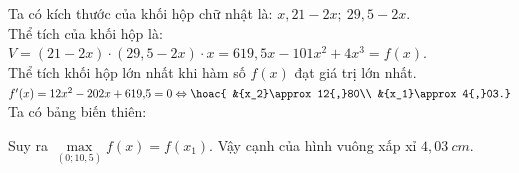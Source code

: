 \begin{bt}
{		Ta có kích thước của khối hộp chữ nhật là: $ x, 21-2x;\ 29, 5-2x$.\\
		Thể tích của khối hộp là: $V=\left(21-2x\right)\cdot \left(29{,}5-2x\right)\cdot x=619{,}5x-101x^2+4x^3=f(x)$.\\
		Thể tích khối hộp lớn nhất khi hàm số $ f(x)$ đạt giá trị lớn nhất.\\
		$ f^\prime(x)=12x^2-202x+619{,}5=0\Leftrightarrow \hoac{
			&{x_2}\approx 12{,}80\\ 
			&{x_1}\approx 4{,}03.}$\\
		Ta có bảng biến thiên:
		\begin{center}
		\end{center}
		Suy ra
		$\max \limits_{(0 ; 10{,}5)} f(x)=f\left(x_1\right)$.
		Vậy cạnh của hình vuông xấp xỉ $ 4{,}03\ cm$.}
\end{bt}

